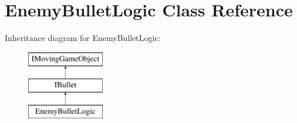\hypertarget{class_enemy_bullet_logic}{}\section{Enemy\+Bullet\+Logic Class Reference}
\label{class_enemy_bullet_logic}
Inheritance diagram for Enemy\+Bullet\+Logic\+:\begin{figure}[H]
\begin{center}
\leavevmode
\includegraphics[height=3.000000cm]{class_enemy_bullet_logic}
\end{center}
\end{figure}
